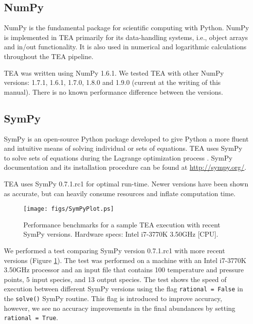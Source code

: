 \subsection{NumPy}
\label{numpy}
  NumPy is the fundamental package for scientific computing with
  Python. NumPy is implemented in TEA primarily for its data-handling
  systems, i.e., object arrays and in/out functionality.  It is also
  used in numerical and logarithmic calculations throughout the TEA
  pipeline.
  

 TEA was written using NumPy 1.6.1. We tested TEA with other NumPy
 versions: 1.7.1, 1.6.1, 1.7.0, 1.8.0 and 1.9.0 (current at the
 writing of this manual). There is no known performance difference
 between the versions.


\subsection{SymPy}
\label{sympy}
  SymPy is an open-source Python package developed to give Python a
  more fluent and intuitive means of solving individual or sets of
  equations.  TEA uses SymPy to solve sets of equations during the
  Lagrange optimization process \citep[Section 3 Equation
  27]{BlecicEtal2015-TEAtheory}. SymPy documentation and its
  installation procedure can be found at \href{http://sympy.org/}
  {\tttm http://sympy.org/}.
  
  TEA uses SymPy 0.7.1.rc1 for optimal run-time. Newer versions have
  been shown as accurate, but can heavily consume resources and
  inflate computation time.
  

\begin{figure}[ht]
\vspace{-0.4cm}
\centerline{\texttt{[image: figs/SymPyPlot.ps]}}
\caption{Performance benchmarks for a sample TEA execution with recent
  SymPy versions. Hardware specs: Intel i7-3770K 3.50GHz [CPU].}
\label{fig:SymPy}
\end{figure}


  We performed a test comparing SymPy version 0.7.1.rc1 with more
  recent versions (Figure \ref{fig:SymPy}). The test was performed on
  a machine with an Intel i7-3770K 3.50GHz processor and an input file
  that contains 100 temperature and pressure points, 5 input species,
  and 13 output species. The test shows the speed of execution between
  different SymPy versions using the flag \texttt{rational = False} in
  the \texttt{solve()} SymPy routine. This flag is introduced to
  improve accuracy, however, we see no accuracy improvements in the
  final abundances by setting \texttt{rational = True}.
  
